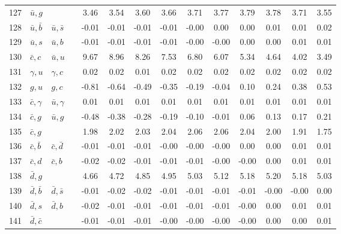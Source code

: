 \begin{tabularx}{\textwidth}{rXXX@{}S@{}S@{}S@{}S@{}S@{}S@{}S@{}S@{}S@{}S}
127 & $\bar u, g$      &                   &                  &  3.46 &  3.54 &  3.60 &  3.66 &  3.71 &  3.77 &  3.79 &  3.78 &  3.71 &  3.55 \\
128 & $\bar u, \bar b$ & $\bar u, \bar s$  &                  & -0.01 & -0.01 & -0.01 & -0.01 & -0.00 &  0.00 &  0.00 &  0.01 &  0.01 &  0.02 \\
129 & $\bar u, s$      & $\bar u, b$       &                  & -0.01 & -0.01 & -0.01 & -0.01 & -0.00 & -0.00 &  0.00 &  0.00 &  0.01 &  0.01 \\
130 & $\bar c, c$      & $\bar u, u$       &                  &  9.67 &  8.96 &  8.26 &  7.53 &  6.80 &  6.07 &  5.34 &  4.64 &  4.02 &  3.49 \\
131 & $\gamma, u$      & $\gamma, c$       &                  &  0.02 &  0.02 &  0.01 &  0.02 &  0.02 &  0.02 &  0.02 &  0.02 &  0.02 &  0.02 \\
132 & $g, u$           & $g,  c$           &                  & -0.81 & -0.64 & -0.49 & -0.35 & -0.19 & -0.04 &  0.10 &  0.24 &  0.38 &  0.53 \\
133 & $\bar c, \gamma$ & $\bar u, \gamma$  &                  &  0.01 &  0.01 &  0.01 &  0.01 &  0.01 &  0.01 &  0.01 &  0.01 &  0.01 &  0.01 \\
134 & $\bar c, g$      & $\bar u, g$       &                  & -0.48 & -0.38 & -0.28 & -0.19 & -0.10 & -0.01 &  0.06 &  0.13 &  0.17 &  0.21 \\
135 & $\bar c, g$      &                   &                  &  1.98 &  2.02 &  2.03 &  2.04 &  2.06 &  2.06 &  2.04 &  2.00 &  1.91 &  1.75 \\
136 & $\bar c, \bar b$ & $\bar c, \bar d$  &                  & -0.01 & -0.01 & -0.01 & -0.00 & -0.00 & -0.00 &  0.00 &  0.00 &  0.01 &  0.01 \\
137 & $\bar c, d$      & $\bar c, b$       &                  & -0.02 & -0.02 & -0.01 & -0.01 & -0.01 & -0.00 & -0.00 &  0.00 &  0.01 &  0.01 \\
138 & $\bar d, g$      &                   &                  &  4.66 &  4.72 &  4.85 &  4.95 &  5.03 &  5.12 &  5.18 &  5.20 &  5.18 &  5.03 \\
139 & $\bar d, \bar b$ & $\bar d, \bar s$  &                  & -0.01 & -0.02 & -0.02 & -0.01 & -0.01 & -0.01 & -0.01 & -0.00 & -0.00 &  0.00 \\
140 & $\bar d, s$      & $\bar d, b$       &                  & -0.02 & -0.01 & -0.01 & -0.01 & -0.01 & -0.01 & -0.00 &  0.00 &  0.01 &  0.01 \\
141 & $\bar d, \bar c$ &                   &                  & -0.01 & -0.01 & -0.01 & -0.00 & -0.00 & -0.00 & -0.00 &  0.00 &  0.00 &  0.01 \\

\end{tabularx}
